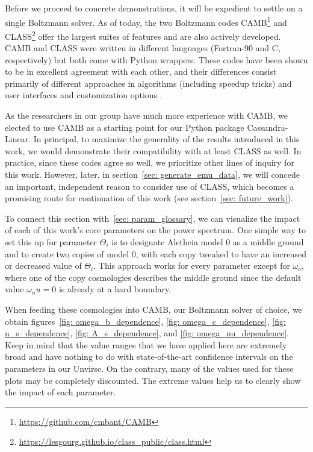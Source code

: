 
Before we proceed to concrete demonstrations, it will be expedient to settle
on a single Boltzmann solver. As of today, the two Boltzmann codes
CAMB\footnote{\url{https://github.com/cmbant/CAMB}} and
CLASS\footnote{\url{https://lesgourg.github.io/class_public/class.html}} offer
the largest suites of features and are also actively developed. CAMB and
CLASS were written in different languages (Fortran-90 and C, respectively)
but both come with Python wrappers. These codes have been shown to be in 
excellent agreement with each other, and their
differences consist primarily of different approaches in algorithms (including 
speedup tricks) and user interfaces and customization options
.

As the researchers in our group have much more experience with CAMB, we 
elected to use CAMB as a starting point for our Python package
Cassandra-Linear. In principal, to maximize the generality of 
the results introduced in this 
work, we would demonstrate their compatibility with at least CLASS as well. In 
practice, since these codes agree so well, we prioritize other lines of 
inquiry
for this work. However, later, in section~\ref{sec: generate_emu_data}, we 
will concede an important, 
independent reason to consider use of CLASS, which becomes a promising route
for continuation of this work (see section~\ref{sec: future_work}).

\begin{comment}
\textcolor{green}{Furthermore, the CLASS documentation
is not nearly as strong as it is with CAMB, and we already encountered
extreme difficulty simply in recreating results already previously obtained
via CAMB!}
\end{comment}


To connect this section with~\ref{sec: param_glossary}, we can visualize the
impact of each of this work's core parameters on the power spectrum. One
simple way to set this up for parameter $\Theta_i$ is to designate Aletheia 
model 0 as a middle ground and to create two copies of model 0, with each
copy tweaked to have an increased or decreased value of $\Theta_i$. This
approach works for every parameter except for $\omega_\nu$, where one of the
copy cosmologies describes the middle ground since the default value
$\omega_nu = 0$ is already at a hard boundary.

When feeding these cosmologies into CAMB, our Boltzmann solver of choice, we
obtain figures~\ref{fig: omega_b_dependence}, \ref{fig: omega_c_dependence}, 
\ref{fig: n_s_dependence}, \ref{fig: A_s_dependence}, and \ref{fig: 
omega_nu_dependence}. Keep in mind that the value ranges that we have applied
here are extremely broad and have nothing to do with state-of-the-art
confidence intervals on the parameters in our Unvirse. On the 
contrary, many of the values used for these plots may be completely 
discounted. The extreme values help us to clearly show the impact of each
parameter.

